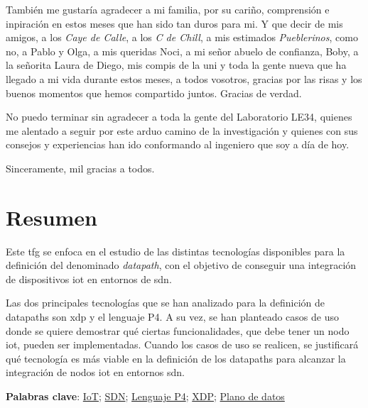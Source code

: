 También me gustaría agradecer a mi familia, por su cariño, comprensión e inpiración en estos meses que han sido tan duros para mi. 	Y que decir de mis amigos, a los \textit{Caye de Calle}, a los \textit{C de Chill},  a mis estimados \textit{Pueblerinos}, como no, a Pablo y Olga, a mis queridas Noci, a mi señor abuelo de confianza, Boby, a la señorita Laura de Diego, mis compis de la uni y toda la gente nueva que ha llegado a mi vida durante estos meses, a todos vosotros, gracias por las risas y los buenos momentos que hemos compartido juntos. Gracias de verdad. \newline


No puedo terminar sin agradecer a toda la gente del Laboratorio LE34, quienes me alentado a seguir por este arduo camino de la investigación y quienes con sus consejos y experiencias han ido conformando al ingeniero que soy a día de hoy.

\vspace{0.5cm}

Sinceramente, mil gracias a todos.




\cleardoublepage %



\chapter{Resumen}
\thispagestyle{empty}
Este \gls{tfg} se enfoca en el estudio de las distintas tecnologías disponibles para la definición del denominado \textit{datapath}, con el objetivo de conseguir una integración de dispositivos \gls{iot} en entornos de \gls{sdn}. \newline

Las dos principales tecnologías que se han analizado para la definición de datapaths son \gls{xdp} y el lenguaje P4. A su vez, se han planteado casos de uso donde se quiere demostrar qué ciertas funcionalidades, que debe tener un nodo \gls{iot}, pueden ser implementadas. Cuando los casos de uso se realicen, se justificará qué tecnología es más viable en la definición de los datapaths para alcanzar la integración de nodos \gls{iot} en entornos \gls{sdn}.

\vspace{1cm}

\textbf{Palabras clave}: \href{https://scholar.google.es/scholar?q=Internet+of+Things}{IoT}; \href{https://www.opennetworking.org/sdn-definition}{SDN};
\href{https://p4.org/}{Lenguaje P4}; \href{https://scholar.google.es/scholar?q=XDP+linux}{XDP};
\href{https://scholar.google.es/scholar?q=Datapaths}{Plano de datos}


